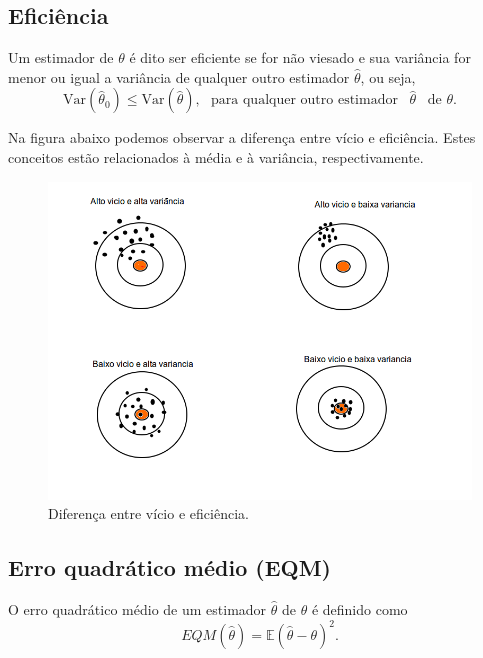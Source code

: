 \documentclass[
]{book}
\theoremstyle{definition}
\theoremstyle{definition}
\theoremstyle{definition}
\theoremstyle{remark}
\begin{document}
\hypertarget{eficiuxeancia}{%
\subsection{Eficiência}\label{eficiuxeancia}}

Um estimador de \(\theta\) é dito ser eficiente se for não viesado e sua variância for menor ou igual a variância de qualquer outro estimador \(\hat{\theta}\), ou seja,
\[
\mbox{Var}(\hat{\theta}_0)\leq \mbox{Var}(\hat{\theta}),\,\,\,\,
        \mbox{para  qualquer outro estimador}\,\,\,\,\, \hat{\theta}\,\,\, \mbox{ de }\theta.
\]

Na figura abaixo podemos observar a diferença entre vício e eficiência. Estes conceitos estão relacionados à média e à variância, respectivamente.

\begin{figure}

{\centering \includegraphics[width=0.8\linewidth]{Figuras/vicio_var} 

}

\caption{Diferença entre vício e eficiência.}\label{fig:Propest}
\end{figure}

\hypertarget{erro-quadruxe1tico-muxe9dio-eqm}{%
\subsection{Erro quadrático médio (EQM)}\label{erro-quadruxe1tico-muxe9dio-eqm}}

O erro quadrático médio de um estimador \(\hat{\theta}\) de \(\theta\) é definido como
\begin{equation}
EQM(\hat\theta) = \mathbb{E}(\hat{\theta} - \theta)^2.
\label{eq:eqm}
\end{equation}
\end{document}

